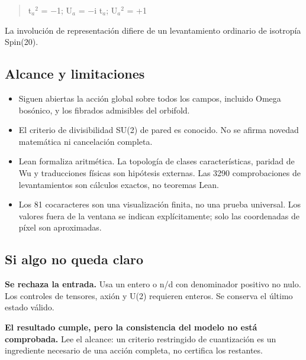 \documentclass[11pt,a4paper]{article}
\begin{document}
\noindent\begin{minipage}{\linewidth}
\begin{quote}t\ensuremath{{}_{a}}\ensuremath{{}^{2}} = \ensuremath{-}1; U\ensuremath{{}_{a}} = \ensuremath{-}i t\ensuremath{{}_{a}}; U\ensuremath{{}_{a}}\ensuremath{{}^{2}} = +1\end{quote}
La involución de representación difiere de un levantamiento ordinario de isotropía Spin(20).

\end{minipage}\par\medskip
\subsection*{Alcance y limitaciones}
\begin{itemize}
\item Siguen abiertas la acción global sobre todos los campos, incluido Omega bosónico, y los fibrados admisibles del orbifold.
\item El criterio de divisibilidad SU(2) de pared es conocido. No se afirma novedad matemática ni cancelación completa.
\item Lean formaliza aritmética. La topología de clases características, paridad de Wu y traducciones físicas son hipótesis externas. Las 3290 comprobaciones de levantamientos son cálculos exactos, no teoremas Lean.
\item Los 81 cocaracteres son una visualización finita, no una prueba universal. Los valores fuera de la ventana se indican explícitamente; solo las coordenadas de píxel son aproximadas.
\end{itemize}
\subsection*{Si algo no queda claro}
\textbf{Se rechaza la entrada.} Usa un entero o n/d con denominador positivo no nulo. Los controles de tensores, axión y U(2) requieren enteros. Se conserva el último estado válido.

\textbf{El resultado cumple, pero la consistencia del modelo no está comprobada.} Lee el alcance: un criterio restringido de cuantización es un ingrediente necesario de una acción completa, no certifica los restantes.
\end{document}
